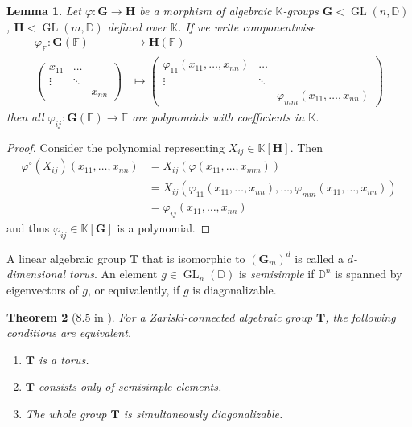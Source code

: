 \documentclass[12pt]{amsart}
\newcommand{\F}{\mathbb{F} }
\newcommand{\D}{\mathbb{D} }
\newcommand{\K}{\mathbb{K}}
\newcommand{\bG}{\mathbf{G}}
\newcommand{\bH}{\mathbf{H}}
\newcommand{\bT}{\mathbf{T}}
\numberwithin{equation}{section}
\newtheorem{theorem}{Theorem}[section]
\newtheorem{lemma}[theorem]{Lemma}
\theoremstyle{remark} %
\begin{document}
\begin{lemma}\label{lem:basic_algebraic_geometry}
	Let $\varphi \colon \bG \to \bH$ be a morphism of algebraic $\K$-groups $\bG < \operatorname{GL}(n,\D)$, $\bH < \operatorname{GL}(m,\D)$ defined over $\K$. If we write componentwise
	\begin{align*}
		\varphi_\F \colon \bG(\F) & \to \bH(\F) \\
		 \begin{pmatrix}
			x_{11} & \ldots & \\ \vdots & \ddots & \\ & & x_{nn}
		\end{pmatrix} & \mapsto \begin{pmatrix}
		\varphi_{11}(x_{11}, \ldots , x_{nn}) & \ldots & \\ \vdots & \ddots & \\ & & \varphi_{mm}(x_{11}, \ldots, x_{nn})
		\end{pmatrix} 
	\end{align*}
	then all $\varphi_{ij} \colon \bG(\F) \to \F $ are polynomials with coefficients in $\K$.
\end{lemma}
\begin{proof}
	Consider the polynomial representing $X_{ij} \in \K[\bH]$. Then 
	\begin{align*}
		\varphi^\circ (X_{ij})(x_{11}, \ldots , x_{nn}) &= X_{ij} (\varphi(x_{11}, \ldots, x_{mm})) \\
		&= X_{ij}(\varphi_{11}(x_{11}, \ldots , x_{nn}), \ldots , \varphi_{mm}(x_{11}, \ldots , x_{nn}))\\
		& = \varphi_{ij}(x_{11}, \ldots , x_{nn})
	\end{align*} 
	and thus $\varphi_{ij} \in \K[\bG]$ is a polynomial.
\end{proof}

 A linear algebraic group $\bT$ that is isomorphic to $(\bG_m)^d$ is called a \emph{$d$-dimensional torus}. An element $g \in \operatorname{GL}_n(\D)$ is \emph{semisimple} if $\D^n$ is spanned by eigenvectors of $g$, or equivalently, if $g$ is diagonalizable. 
 
 \begin{theorem}[8.5 in \cite{Bor}] %
 	\label{thm:bor_torus}
 	For a Zariski-connected algebraic group $\bT$, the following conditions are equivalent.
 	\begin{enumerate}
 		\item $\bT$ is a torus.
 		\item $\bT$ consists only of semisimple elements.
 		\item The whole group $\bT$ is simultaneously diagonalizable.
 	\end{enumerate}
 \end{theorem}
\end{document}
